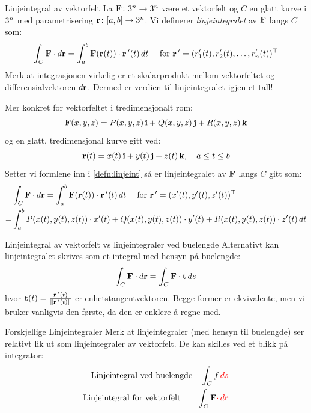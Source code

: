 \begin{defn}{Linjeintegral av vektorfelt}
La $\mathbf{F} \colon 3^n \rightarrow 3^n$ være et vektorfelt og $C$ en glatt kurve i $3^n$ med parametrisering $\mathbf{r} \colon [a,b] \rightarrow 3^n$. Vi definerer \emph{linjeintegralet} av \( \mathbf{F} \) langs \( C \) som:
\begin{align}\label{defn:linjeint}
\int_C \mathbf{F} \cdot d\mathbf{r} = \int_a^b \mathbf{F}(\mathbf{r}(t)) \cdot \mathbf{r}\,'(t)\, dt \quad \text{ for } \mathbf{r}\,'=(r_1'(t),r_2'(t),\ldots, r_n'(t))^\top
\end{align}
Merk at integrasjonen virkelig er et skalarprodukt mellom vektorfeltet og differensialvektoren \( d\mathbf{r} \). Dermed er verdien til linjeintegralet igjen et tall!
\end{defn}
Mer konkret for vektorfeltet i tredimensjonalt rom:
\[
\mathbf{F}(x, y, z) = P(x, y, z)\, \mathbf{i} + Q(x, y, z)\, \mathbf{j} + R(x, y, z)\, \mathbf{k}
\]
og en glatt, tredimensjonal kurve gitt ved:
\[
\mathbf{r}(t) = x(t)\, \mathbf{i} + y(t)\, \mathbf{j} + z(t)\, \mathbf{k}, \quad a \leq t \leq b
\]
Setter vi formlene inn i \eqref{defn:linjeint} så er linjeintegralet av \( \mathbf{F} \) langs \( C \) gitt som:
\begin{align*}
&\int_C \mathbf{F} \cdot d\mathbf{r} = \int_a^b \mathbf{F}(\mathbf{r}(t)) \cdot \mathbf{r}\,'(t)\, dt \quad \text{ for } \mathbf{r}\,'=(x'(t),y'(t),z'(t))^\top \\=&\int_a^b P(x(t),y(t),z(t)) \cdot x'(t) + Q(x(t),y(t),z(t))\cdot y'(t) + R(x(t),y(t),z(t)) \cdot z'(t)\, dt
\end{align*}
\begin{oppsum}{Linjeintegral av vektorfelt vs linjeintegraler ved buelengde}
Alternativt kan linjeintegralet skrives som et integral med hensyn på buelengde:
\[
\int_C \mathbf{F} \cdot d\mathbf{r} = \int_C \mathbf{F} \cdot \mathbf{t}\, ds
\]
hvor \( \mathbf{t}(t) = \frac{\mathbf{r}\,'(t)}{\|\mathbf{r}\,'(t)\|} \) er enhetstangentvektoren.
Begge former er ekvivalente, men vi bruker vanligvis den første, da den er enklere å regne med.
\end{oppsum}
\begin{rem}{Forskjellige Linjeintegraler}
Merk at linjeintegraler (med hensyn til buelengde) ser relativt lik ut som linjeintegraler av vektorfelt. De kan skilles ved et blikk på integrator:
\begin{align*}
\text{Linjeintegral ved buelengde} \quad \int_C f \, {\color{red}ds}\\
\text{Linjeintegral for vektorfelt} \qquad \int_C \mathbf{F} {\color{red} \cdot \, d\mathbf{r}}  
\end{align*}
\end{rem}

